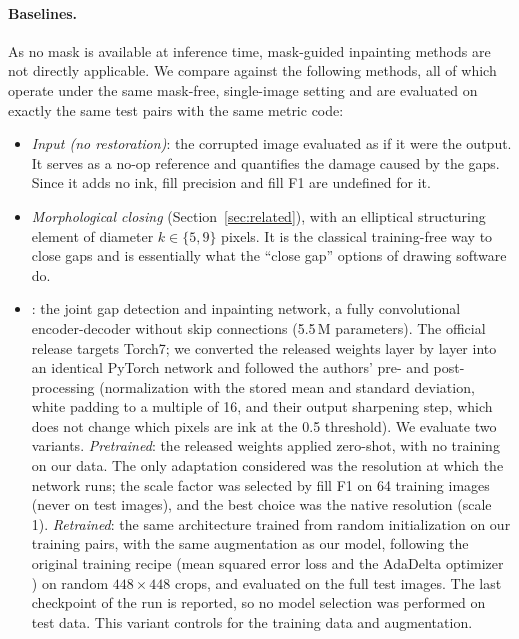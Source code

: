 \documentclass[pdflatex,sn-mathphys-num]{sn-jnl}%
\begin{document}
\paragraph{Baselines.} As no mask is available at inference time, mask-guided
inpainting methods are not directly applicable. We compare against the following
methods, all of which operate under the same mask-free, single-image setting and are
evaluated on exactly the same test pairs with the same metric code:
\begin{itemize}
\item \emph{Input (no restoration)}: the corrupted image evaluated as if it were the
  output. It serves as a no-op reference and quantifies the damage caused by the gaps. Since it
  adds no ink, fill precision and fill F1 are undefined for it.
\item \emph{Morphological closing} \citep{serra1982morphology,soille2003morphological}
  (Section~\ref{sec:related}), with an elliptical structuring element of diameter
  $k \in \{5, 9\}$ pixels. It is the classical training-free way to close gaps and
  is essentially what the ``close gap'' options of drawing software do.
\item \emph{\citet{sasaki2017joint}}: the joint gap detection and
  inpainting network, a fully convolutional encoder-decoder without skip connections
  (5.5\,M parameters). The official release targets Torch7; we converted the released
  weights layer by layer into an identical PyTorch network and followed the authors'
  pre- and post-processing (normalization with the stored mean and standard deviation,
  white padding to a multiple of 16, and their output sharpening step, which does not
  change which pixels are ink at the 0.5 threshold). We evaluate two variants.
  \emph{Pretrained}: the released weights applied zero-shot, with no training on our
  data. The only adaptation considered was the resolution at which the network runs;
  the scale factor was selected by fill F1 on 64 training images (never on test
  images), and the best choice was the native resolution (scale 1). \emph{Retrained}:
  the same architecture trained from random initialization on our training pairs, with
  the same augmentation as our model, following the original training recipe (mean
  squared error loss and the AdaDelta optimizer \citep{zeiler2012adadelta}) on random
  $448\times 448$ crops, and evaluated on the full test images. The last checkpoint of
  the run is reported, so no model selection was performed on test data. This variant controls for the training data and augmentation.
\end{itemize}
\end{document}
